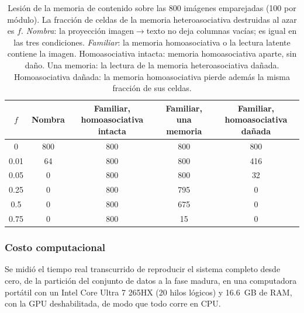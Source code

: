 \begin{table}[H]
\centering
\caption[Lesión de la memoria de contenido]{Lesión de la memoria de contenido sobre las 800 imágenes emparejadas
(100 por módulo). La fracción de celdas de la memoria heteroasociativa destruidas al
azar es $f$.
\emph{Nombra}: la proyección imagen$\to$texto no deja columnas vacías; es igual en las
tres condiciones. \emph{Familiar}: la memoria homoasociativa o la lectura latente
contiene la imagen.
Homoasociativa intacta: memoria homoasociativa aparte, sin daño. Una memoria: la
lectura de la memoria heteroasociativa dañada. Homoasociativa dañada: la memoria
homoasociativa pierde además la misma fracción de sus celdas.}
\label{tab:lesion}
\footnotesize
\setlength{\tabcolsep}{3pt}
\begin{tabular}{ccccc}
\toprule
$f$ & Nombra & Familiar, homoasociativa intacta & Familiar, una memoria & Familiar, homoasociativa dañada \\
\midrule
0    & 800 & 800 & 800 & 800 \\
0.01 &  64 & 800 & 800 & 416 \\
0.05 &   0 & 800 & 800 &  32 \\
0.25 &   0 & 800 & 795 &   0 \\
0.5  &   0 & 800 & 675 &   0 \\
0.75 &   0 & 800 &  15 &   0 \\
\bottomrule
\end{tabular}
\end{table}

\subsubsection{Costo computacional}
\label{sec:costo}

Se midió el tiempo real transcurrido de reproducir el sistema completo desde cero, de la
partición del conjunto de datos a la fase madura, en una computadora portátil con un
Intel Core Ultra 7 265HX (20 hilos lógicos) y 16.6~GB de RAM, con la GPU deshabilitada,
de modo que todo corre en CPU.

